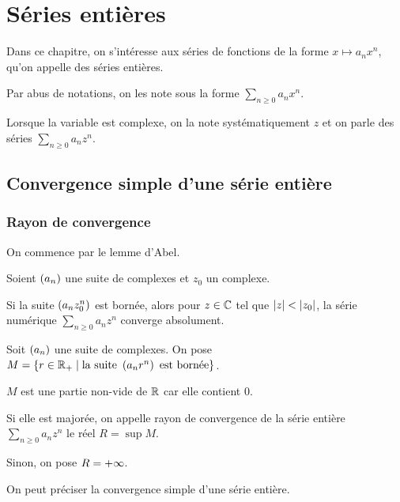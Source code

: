 \chapter{Séries entières}

\minitoc

Dans ce chapitre, on s'intéresse aux séries de fonctions de la forme \(x\mapsto a_nx^n\), qu'on appelle des séries entières.

Par abus de notations, on les note sous la forme \(\sum_{n\geq0}a_nx^n\).

Lorsque la variable est complexe, on la note systématiquement \(z\) et on parle des séries \(\sum_{n\geq0}a_nz^n\).

\section{Convergence simple d'une série entière}

\subsection{Rayon de convergence}

On commence par le lemme d'Abel.

\begin{prop}
Soient \(\left(a_n\right)\) une suite de complexes et \(z_0\) un complexe.

Si la suite \(\left(a_nz_0^n\right)\) est bornée, alors pour \(z\in\mathbb{C}\) tel que \(\left\lvert z\right\rvert<\left\lvert z_0\right\rvert\), la série numérique \(\sum_{n\geq0}a_nz^n\) converge absolument.
\end{prop}

\begin{defi}
Soit \(\left(a_n\right)\) une suite de complexes. On pose \(M=\left\lbrace r\in\mathbb{R}_+\;\middle|\;\text{la suite }\left(a_nr^n\right)\text{ est bornée}\right\rbrace\).

\(M\) est une partie non-vide de \(\mathbb{R}\) car elle contient \(0\).

Si elle est majorée, on appelle rayon de convergence de la série entière \(\sum_{n\geq0}a_nz^n\) le réel \(R=\sup M\).

Sinon, on pose \(R=+\infty\).
\end{defi}

On peut préciser la convergence simple d'une série entière.

